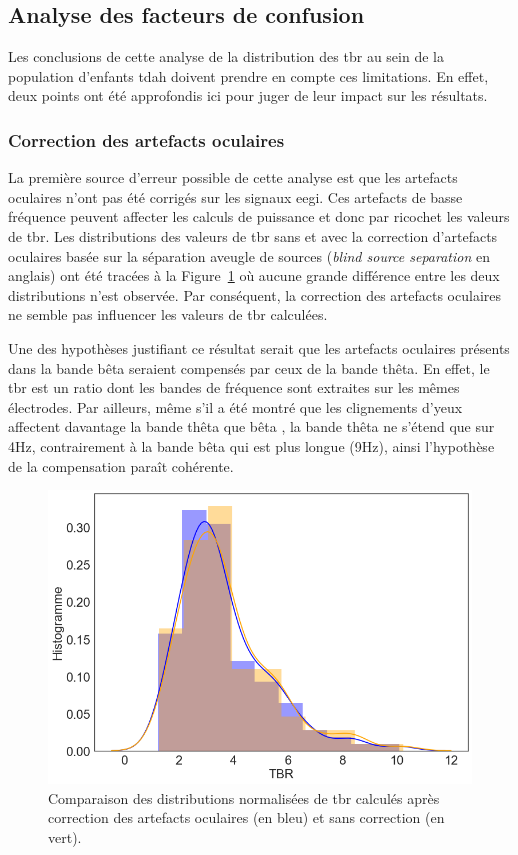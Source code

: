 \subsection{Analyse des facteurs de confusion}

Les conclusions de cette analyse de la distribution des \gls{tbr} au sein de la population d'enfants \gls{tdah} doivent prendre en compte ces limitations.
En effet, deux points ont été approfondis ici pour juger de leur impact sur les résultats.

\subsubsection{Correction des artefacts oculaires}

La première source d'erreur possible de cette analyse est que les artefacts oculaires n'ont pas été corrigés sur les signaux \gls{eegi}. Ces artefacts de basse fréquence
peuvent affecter les calculs de puissance et donc par ricochet les valeurs de \gls{tbr}. Les distributions des valeurs de \gls{tbr} sans et avec 
la correction d'artefacts oculaires basée sur la séparation aveugle de sources (\textit{blind source separation} en anglais) \citep{Barthelemy2017} 
ont été tracées à la Figure~\ref{Figure:tbr_eye_artifact_correction} où aucune grande différence entre les deux distributions n'est observée. Par conséquent, la correction des artefacts 
oculaires ne semble pas influencer les valeurs de \gls{tbr} calculées. 

Une des hypothèses justifiant ce 
résultat serait que les artefacts oculaires présents dans la bande bêta seraient compensés par ceux de la bande thêta. En effet, le \gls{tbr} est un ratio dont les bandes de
fréquence sont extraites sur les mêmes électrodes. Par ailleurs, même s'il a été montré que les clignements d'yeux affectent davantage la bande thêta que bêta \citep{Barthelemy2017},
la bande thêta ne s'étend que sur 4Hz, contrairement à la bande bêta qui est plus longue (9Hz), ainsi l'hypothèse de la compensation paraît cohérente.


\begin{figure}[h!]
  \centering
	\includegraphics[width=0.7\linewidth]{figures/chapter-4/tbr-eye-artifact-correction} 
  \caption[Comparaison des distributions normalisées de \gls{tbr} calculés après correction des artefacts 
	oculaires et sans correction.]{Comparaison des distributions normalisées de \gls{tbr} calculés après correction des artefacts oculaires (en bleu) et sans correction (en vert).}
  \label{Figure:tbr_eye_artifact_correction}
\end{figure}

